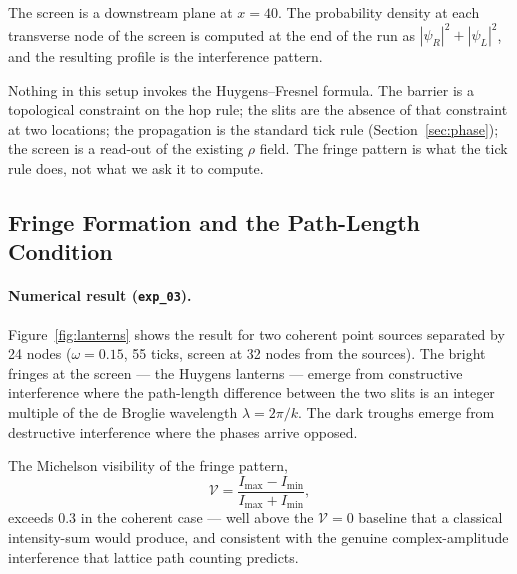 The screen is a downstream plane at $x = 40$. The probability
density at each transverse node of the screen is computed at the end
of the run as $|\psi_R|^2 + |\psi_L|^2$, and the resulting profile is
the interference pattern.

Nothing in this setup invokes the Huygens--Fresnel formula. The
barrier is a topological constraint on the hop rule; the slits are
the absence of that constraint at two locations; the propagation is
the standard tick rule (Section~\ref{sec:phase}); the screen is a
read-out of the existing $\rho$ field. The fringe pattern is what the
tick rule does, not what we ask it to compute.

\subsection{Fringe Formation and the Path-Length Condition}
\label{subsec:fringes}

\begin{figure}[!t]
  \centering
  
\end{figure}

\paragraph{Numerical result (\texttt{exp\_03}).}
Figure~\ref{fig:lanterns} shows the result for two coherent point
sources separated by 24 nodes ($\omega = 0.15$, 55 ticks, screen at
32 nodes from the sources). The bright fringes at the screen --- the
Huygens lanterns --- emerge from constructive interference where the
path-length difference between the two slits is an integer multiple
of the de Broglie wavelength $\lambda = 2\pi/k$. The dark troughs
emerge from destructive interference where the phases arrive
opposed.

The Michelson visibility of the fringe pattern,
\begin{equation}
    \mathcal{V} = \frac{I_\text{max} - I_\text{min}}{I_\text{max} + I_\text{min}},
    \label{eq:visibility}
\end{equation}
exceeds $0.3$ in the coherent case --- well above the
$\mathcal{V} = 0$ baseline that a classical intensity-sum would
produce, and consistent with the genuine complex-amplitude
interference that lattice path counting predicts.

